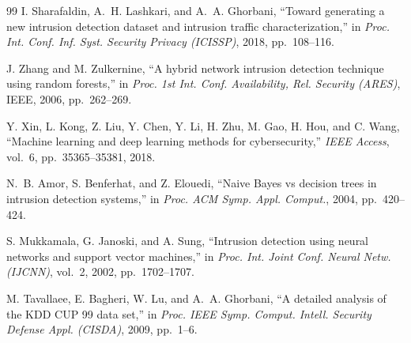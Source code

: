 \documentclass[12pt, letterpaper, oneside]{report}
\begin{document}
\begin{thebibliography}{99}
I. Sharafaldin, A.~H. Lashkari, and A.~A. Ghorbani, ``Toward generating a new intrusion detection dataset and intrusion traffic characterization,'' in \textit{Proc. Int. Conf. Inf. Syst. Security Privacy (ICISSP)}, 2018, pp.~108--116.

J. Zhang and M. Zulkernine, ``A hybrid network intrusion detection technique using random forests,'' in \textit{Proc. 1st Int. Conf. Availability, Rel. Security (ARES)}, IEEE, 2006, pp.~262--269.

Y. Xin, L. Kong, Z. Liu, Y. Chen, Y. Li, H. Zhu, M. Gao, H. Hou, and C. Wang, ``Machine learning and deep learning methods for cybersecurity,'' \textit{IEEE Access}, vol.~6, pp.~35365--35381, 2018.

N.~B. Amor, S. Benferhat, and Z. Elouedi, ``Naive Bayes vs decision trees in intrusion detection systems,'' in \textit{Proc. ACM Symp. Appl. Comput.}, 2004, pp.~420--424.

S. Mukkamala, G. Janoski, and A. Sung, ``Intrusion detection using neural networks and support vector machines,'' in \textit{Proc. Int. Joint Conf. Neural Netw. (IJCNN)}, vol.~2, 2002, pp.~1702--1707.

M. Tavallaee, E. Bagheri, W. Lu, and A.~A. Ghorbani, ``A detailed analysis of the KDD CUP 99 data set,'' in \textit{Proc. IEEE Symp. Comput. Intell. Security Defense Appl. (CISDA)}, 2009, pp.~1--6.

\end{thebibliography}


\end{document}
